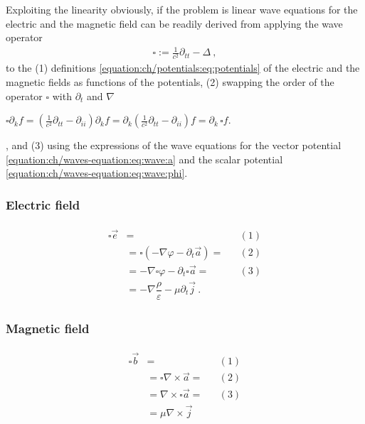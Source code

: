 \documentclass[letterpaper,10pt,english]{jupyterBook}
\begin{document}
\sphinxAtStartPar
Exploiting the linearity \sphinxhyphen{} obviously, if the problem is linear \sphinxhyphen{} wave equations for the electric and the magnetic field can be readily derived from applying the wave operator
\begin{equation*}
\begin{split}\square := \frac{1}{c^2} \partial_{tt} - \Delta \ ,\end{split}
\end{equation*}
\sphinxAtStartPar
to the (1) definitions \eqref{equation:ch/potentials:eq:potentials} of the electric and the magnetic fields as functions of the potentials, (2) swapping the order of the operator \(\square\) with \(\partial_t\) and \(\nabla\)%
\begin{footnote}[1]\sphinxAtStartFootnote
\(\square \partial_k f = \left( \frac{1}{c^2} \partial_{tt} - \partial_{ii} \right) \partial_k f = \partial_k \left( \frac{1}{c^2} \partial_{tt} - \partial_{ii} \right) f = \partial_k \, \square f \).
%
\end{footnote}, and (3) using the expressions of the wave equations for the vector potential \eqref{equation:ch/waves-equation:eq:wave:a} and the scalar potential \eqref{equation:ch/waves-equation:eq:wave:phi}.


\subsubsection{Electric field}
\label{\detokenize{ch/waves-equation:electric-field}}\begin{equation*}
\begin{split}\begin{aligned}
\square \vec{e} & = && (1) \\
& =\square ( -\nabla \varphi - \partial_t \vec{a}) = && (2) \\
& = - \nabla \square \varphi - \partial_t \square \vec{a} = && (3) \\
& = - \nabla \dfrac{\rho}{\varepsilon} - \mu \partial_t \vec{j}  \ .
\end{aligned}\end{split}
\end{equation*}

\subsubsection{Magnetic field}
\label{\detokenize{ch/waves-equation:magnetic-field}}\begin{equation*}
\begin{split}\begin{aligned}
 \square \vec{b} & = && (1) \\
 & = \square \nabla \times \vec{a} = && (2) \\
 & = \nabla \times \square \vec{a} = && (3) \\
 & = \mu \nabla \times \vec{j}
\end{aligned}\end{split}
\end{equation*}
\end{document}
